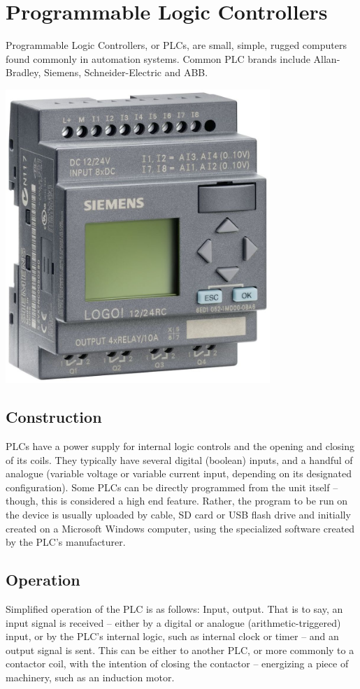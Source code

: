 \documentclass[11pt,a4paper]{article}
\begin{document}
\section{Programmable Logic Controllers}
Programmable Logic Controllers, or PLCs, are small, simple, rugged computers found commonly in automation systems. Common PLC brands include Allan-Bradley, Siemens, Schneider-Electric and ABB.
\begin{center}
\includegraphics[width=10cm]{plc}
\end{center}
\subsection*{Construction}
PLCs have a power supply for internal logic controls and the opening and closing of its coils. They typically have several digital (boolean) inputs, and a handful of analogue (variable voltage or variable current input, depending on its designated configuration). Some PLCs can be directly programmed from the unit itself -- though, this is considered a high end feature. Rather, the program to be run on the device is usually uploaded by cable, SD card or USB flash drive and initially created on a Microsoft Windows computer, using the specialized software created by the PLC's manufacturer.
\subsection*{Operation}
Simplified operation of the PLC is as follows: Input, output. That is to say, an input signal is received -- either by a digital or analogue (arithmetic-triggered) input, or by the PLC's internal logic, such as internal clock or timer -- and an output signal is sent. This can be either to another PLC, or more commonly to a contactor coil, with the intention of closing the contactor -- energizing a piece of machinery, such as an induction motor.
\end{document}

